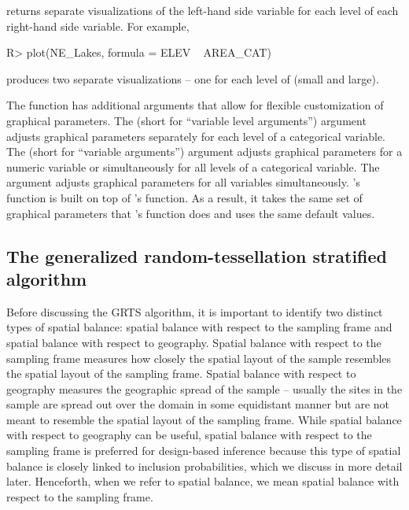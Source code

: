 \documentclass[
  shortnames]{jss}
\begin{document}
 returns separate visualizations of the left-hand side
variable for each level of each right-hand side variable. For example,

\begin{CodeChunk}
\begin{CodeInput}
R> plot(NE_Lakes, formula = ELEV ~ AREA_CAT)
\end{CodeInput}
\end{CodeChunk}

produces two separate visualizations -- one for each level of
 (small and large).

The  function has additional arguments that allow for
flexible customization of graphical parameters. The 
(short for ``variable level arguments'') argument adjusts graphical
parameters separately for each level of a categorical variable. The
 (short for ``variable arguments'') argument adjusts
graphical parameters for a numeric variable or simultaneously for all
levels of a categorical variable. The  argument adjusts
graphical parameters for all variables simultaneously. 's
 function is built on top of 's 
function. As a result, it takes the same set of graphical parameters
that 's  function does and uses the same default
values.

\hypertarget{subsec:grts_algorithm}{%
\subsection{The generalized random-tessellation stratified
algorithm}\label{subsec:grts_algorithm}}

Before discussing the GRTS algorithm, it is important to identify two
distinct types of spatial balance: spatial balance with respect to the
sampling frame and spatial balance with respect to geography. Spatial
balance with respect to the sampling frame measures how closely the
spatial layout of the sample resembles the spatial layout of the
sampling frame. Spatial balance with respect to geography measures the
geographic spread of the sample -- usually the sites in the sample are
spread out over the domain in some equidistant manner but are not meant
to resemble the spatial layout of the sampling frame. While spatial
balance with respect to geography can be useful, spatial balance with
respect to the sampling frame is preferred for design-based inference
because this type of spatial balance is closely linked to inclusion
probabilities, which we discuss in more detail later. Henceforth, when
we refer to spatial balance, we mean spatial balance with respect to the
sampling frame.
\end{document}
